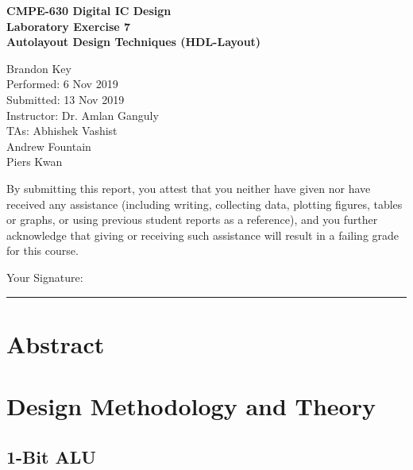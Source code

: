 \documentclass[11pt]{article}
\begin{document}
%
%

\vspace*{2 cm}

\begin{center}
\bf{CMPE-630 Digital IC Design\\
    Laboratory Exercise 7\\
\vspace{0.25 cm}
Autolayout Design Techniques (HDL-Layout)
}
\end{center}

\vspace{6 cm}

\begin{flushright}
Brandon Key\\
Performed: 6 Nov 2019\\
Submitted: 13 Nov 2019\\
\vspace{0.5 cm}
Instructor: Dr. Amlan Ganguly\\
TAs: Abhishek Vashist\\
Andrew Fountain\\
Piers Kwan\\
\vspace{0.5 cm}
\end{flushright}

\vspace{3 cm}
\indent By submitting this report, you attest that you neither have given nor have received any assistance (including writing, collecting data, plotting figures, tables or graphs, or using previous student reports as a reference), and you further acknowledge that giving or receiving such assistance will result in a failing grade for this course.

\vspace{1 cm}
Your Signature:   \rule{13cm}{.1pt}


\newpage

\section{Abstract}
	

\section{Design Methodology and Theory}

	\subsection{1-Bit ALU}	
	
\end{document}
